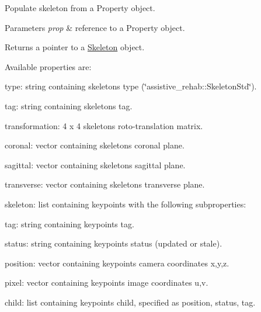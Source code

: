 Populate skeleton from a Property object. 


\begin{DoxyParams}{Parameters}
{\em prop} & reference to a Property object. \\
\hline
\end{DoxyParams}
\begin{DoxyReturn}{Returns}
a pointer to a \mbox{\hyperlink{classassistive__rehab_1_1Skeleton}{Skeleton}} object.
\end{DoxyReturn}
Available properties are\+:
\begin{DoxyItemize}
\item type\+: string containing skeleton\textquotesingle{}s type (\char`\"{}assistive\+\_\+rehab\+::\+Skeleton\+Std\char`\"{}).
\item tag\+: string containing skeleton\textquotesingle{}s tag.
\item transformation\+: 4 x 4 skeleton\textquotesingle{}s roto-\/translation matrix.
\item coronal\+: vector containing skeleton\textquotesingle{}s coronal plane.
\item sagittal\+: vector containing skeleton\textquotesingle{}s sagittal plane.
\item transverse\+: vector containing skeleton\textquotesingle{}s transverse plane.
\item skeleton\+: list containing keypoints with the following subproperties\+:
\begin{DoxyItemize}
\item tag\+: string containing keypoint\textquotesingle{}s tag.
\item status\+: string containing keypoint\textquotesingle{}s status (updated or stale).
\item position\+: vector containing keypoint\textquotesingle{}s camera coordinates x,y,z.
\item pixel\+: vector containing keypoint\textquotesingle{}s image coordinates u,v.
\item child\+: list containing keypoint\textquotesingle{}s child, specified as position, status, tag. 
\end{DoxyItemize}
\end{DoxyItemize}